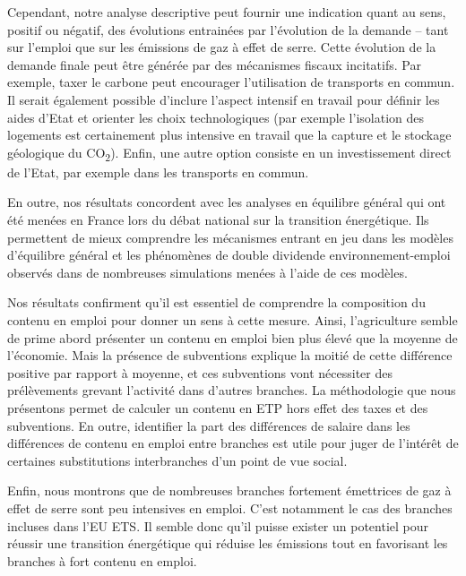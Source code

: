 Cependant, notre analyse descriptive peut fournir une indication quant au sens, positif ou négatif, des évolutions entrainées par l’évolution de la demande – tant sur l’emploi que sur les émissions de gaz à effet de serre. 
Cette évolution de la demande finale peut être générée par des mécanismes fiscaux incitatifs. 
Par exemple, taxer le carbone peut encourager l’utilisation de transports en commun. 
Il serait également possible d’inclure l’aspect intensif en travail pour définir les aides d’Etat et orienter les choix technologiques (par exemple l'isolation des logements est certainement plus intensive en travail que la capture et le stockage géologique du CO\textsubscript{2}). 
Enfin, une autre option consiste en un investissement direct de l’Etat, par exemple dans les transports en commun.

En outre, nos résultats concordent avec les analyses en équilibre général qui ont été menées en France lors du débat national sur la transition énergétique. Ils permettent de mieux comprendre les mécanismes entrant en jeu dans les modèles d’équilibre général et les phénomènes de double dividende environnement-emploi observés dans de nombreuses simulations menées à l’aide de ces modèles.

Nos résultats confirment qu’il est essentiel de comprendre la composition du contenu en emploi pour donner un sens à cette mesure. 
Ainsi, l’agriculture semble de prime abord présenter un contenu en emploi bien plus élevé que la moyenne de l’économie. Mais la présence de subventions explique la moitié de cette différence positive par rapport à moyenne, et ces subventions vont nécessiter des prélèvements grevant l’activité dans d'autres branches. 
La méthodologie que nous présentons permet de calculer un contenu en ETP hors effet des taxes et des subventions. En outre, identifier la part des différences de salaire dans les différences de contenu en emploi entre branches est utile pour juger de l’intérêt de certaines substitutions interbranches d’un point de vue social.

Enfin, nous montrons que de nombreuses branches fortement émettrices de gaz à effet de serre sont peu intensives en emploi. C’est notamment le cas des branches incluses dans l’EU ETS. Il semble donc qu’il puisse exister un potentiel pour réussir une transition énergétique qui réduise les émissions tout en favorisant les branches à fort contenu en emploi.




